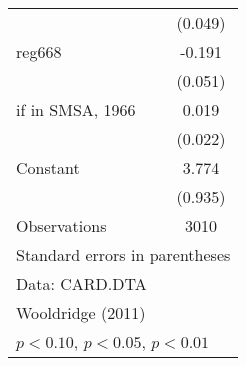 \begin{table}[htbp]
\begin{tabular}{l*{1}{c}}
                    &     (0.049)         \\
\addlinespace
reg668              &      -0.191\sym{***}\\
                    &     (0.051)         \\
\addlinespace
=1 if in SMSA, 1966 &       0.019         \\
                    &     (0.022)         \\
\addlinespace
Constant            &       3.774\sym{***}\\
                    &     (0.935)         \\
\midrule
Observations        &        3010         \\
\bottomrule
\multicolumn{2}{l}{\footnotesize Standard errors in parentheses}\\
\multicolumn{2}{l}{\footnotesize Data: CARD.DTA}\\
\multicolumn{2}{l}{\footnotesize Wooldridge (2011)}\\
\multicolumn{2}{l}{\footnotesize \sym{*} \(p<0.10\), \sym{**} \(p<0.05\), \sym{***} \(p<0.01\)}\\
\end{tabular}
\end{table}
